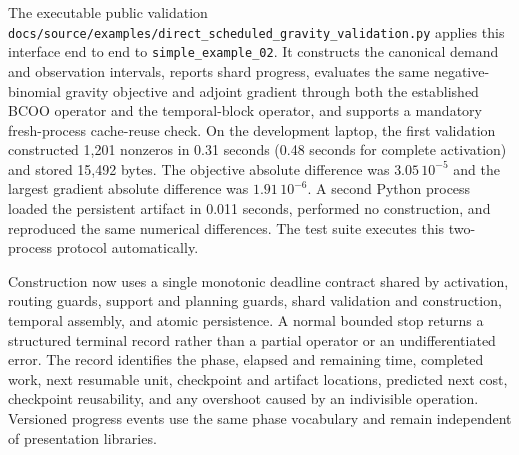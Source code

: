 The executable public validation
\texttt{docs/source/examples/direct\_scheduled\_gravity\_validation.py} applies
this interface end to end to \texttt{simple\_example\_02}.  It constructs the
canonical demand and observation intervals, reports shard progress, evaluates
the same negative-binomial gravity objective and adjoint gradient through both
the established BCOO operator and the temporal-block operator, and supports a
mandatory fresh-process cache-reuse check.  On the development laptop, the
first validation constructed 1,201 nonzeros in 0.31 seconds (0.48 seconds for
complete activation) and stored 15,492 bytes.  The objective absolute difference
was $3.05\,10^{-5}$ and the largest gradient absolute difference was
$1.91\,10^{-6}$.  A second Python process loaded the persistent artifact in
0.011 seconds, performed no construction, and reproduced the same numerical
differences.  The test suite executes this two-process protocol automatically.

Construction now uses a single monotonic deadline contract shared by activation,
routing guards, support and planning guards, shard validation and construction,
temporal assembly, and atomic persistence.  A normal bounded stop returns a
structured terminal record rather than a partial operator or an undifferentiated
error.  The record identifies the phase, elapsed and remaining time, completed
work, next resumable unit, checkpoint and artifact locations, predicted next
cost, checkpoint reusability, and any overshoot caused by an indivisible
operation.  Versioned progress events use the same phase vocabulary and remain
independent of presentation libraries.

